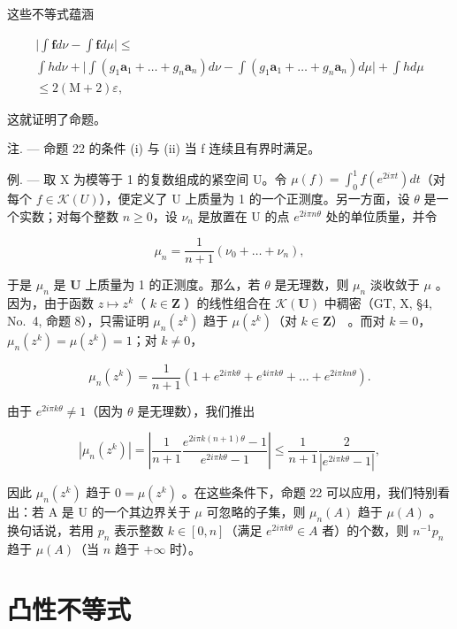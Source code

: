 这些不等式蕴涵

\[
\begin{array}{c} \Big | \int \mathbf {f}   d \nu - \int \mathbf {f}   d \mu \Big | \leqslant \\ \int h   d \nu + \Big | \int (g _ {1} \mathbf {a} _ {1} + \dots + g _ {n} \mathbf {a} _ {n})   d \nu - \int (g _ {1} \mathbf {a} _ {1} + \dots + g _ {n} \mathbf {a} _ {n})   d \mu \Big | + \int h   d \mu \\ \leqslant 2 (\mathrm{M} + 2) \varepsilon , \end{array}
\]

这就证明了命题。

注. --- 命题 22 的条件 (i) 与 (ii) 当 f 连续且有界时满足。

例. --- 取 X 为模等于 1 的复数组成的紧空间 U。令 \(\mu(f) = \int_{0}^{1} f(e^{2i\pi t}) dt\)（对每个 \(f \in \mathcal{K}(U)\)），便定义了 U 上质量为 1 的一个正测度。另一方面，设 \(\theta\) 是一个实数；对每个整数 \(n \geqslant 0\)，设 \(\nu_{n}\) 是放置在 U 的点 \(e^{2i\pi n\theta}\) 处的单位质量，并令

\[
\mu_ {n} = \frac {1}{n + 1} (\nu_ {0} + \dots + \nu_ {n}),
\]

于是 \(\mu_n\) 是 \(\mathbf{U}\) 上质量为 1 的正测度。那么，若 \(\theta\) 是无理数，则 \(\mu_n\) 淡收敛于 \(\mu\) 。因为，由于函数 \(z \mapsto z^k\)（ \(k \in \mathbf{Z}\) ）的线性组合在 \(\mathcal{K}(\mathbf{U})\) 中稠密（GT, X, §4, No.~4, 命题 8），只需证明 \(\mu_n(z^k)\) 趋于 \(\mu(z^k)\)（对 \(k \in \mathbf{Z}\)） 。而对 \(k = 0\)，\(\mu_n(z^k) = \mu(z^k) = 1\)；对 \(k \neq 0\)，

\[
\mu_ {n} (z ^ {k}) = \frac {1}{n + 1} (1 + e ^ {2 i \pi k \theta} + e ^ {4 i \pi k \theta} + \dots + e ^ {2 i \pi k n \theta}).
\]

由于 \(e^{2i\pi k\theta} \neq 1\)（因为 \(\theta\) 是无理数），我们推出

\[
\left| \mu_ {n} (z ^ {k}) \right| = \left| \frac {1}{n + 1} \frac {e ^ {2 i \pi k (n + 1) \theta} - 1}{e ^ {2 i \pi k \theta} - 1} \right| \leqslant \frac {1}{n + 1} \frac {2}{\left| e ^ {2 i \pi k \theta} - 1 \right|},
\]

因此 \(\mu_n(z^k)\) 趋于 \(0 = \mu (z^k)\) 。在这些条件下，命题 22 可以应用，我们特别看出：若 A 是 U 的一个其边界关于 \(\mu\) 可忽略的子集，则 \(\mu_n(A)\) 趋于 \(\mu(A)\) 。换句话说，若用 \(p_n\) 表示整数 \(k \in [0, n]\)（满足 \(e^{2i\pi k\theta} \in A\) 者）的个数，则 \(n^{-1}p_n\) 趋于 \(\mu(A)\)（当 \(n\) 趋于 \(+\infty\) 时）。

\section{凸性不等式}

